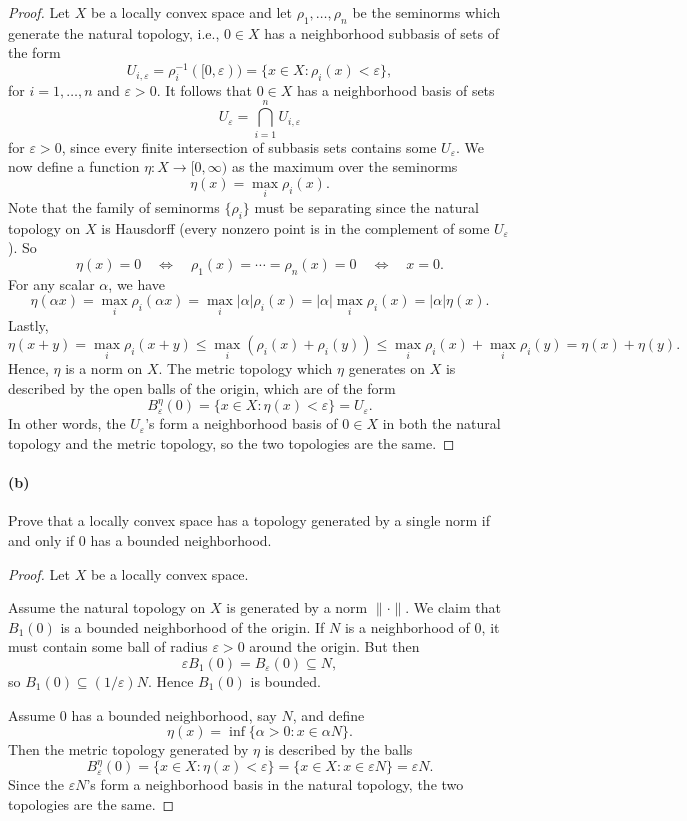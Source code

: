 \documentclass[12pt]{article}
\newlength{\myparskip}
\newenvironment{fullbox}{\begin{lrbox}{\savefullbox}\begin{minipage}{\dimexpr\textwidth-2\fboxsep\relax}\setlength{\parskip}{\myparskip}}{\end{minipage}\end{lrbox}\framebox[\textwidth]{\usebox{\savefullbox}}}
\newenvironment{pbox}[1][]{\begin{fullbox}\def\temp{#1}\ifx\temp\empty\else\paragraph{#1}\phantom{}\fi}{\end{fullbox}}
\theoremstyle{definition}
\newcommand{\isp}[1]{\quad\text{#1}\quad}
\newcommand{\eps}{\varepsilon}
\newcommand{\<}{\langle}
\renewcommand{\>}{\rangle}
\newcommand{\seq}{\subseteq}
\begin{document}
\begin{proof}
    Let $X$ be a locally convex space and let $\rho_1, \dots, \rho_n$ be the seminorms which generate the natural topology, i.e., $0 \in X$ has a neighborhood subbasis of sets of the form
    \[
        U_{i, \eps}
            = \rho_i^{-1}([0, \eps))
            = \{x \in X : \rho_i(x) < \eps\},
    \]
    for $i = 1, \dots, n$ and $\eps > 0$.
    It follows that $0 \in X$ has a neighborhood basis of sets
    \[  
        U_\eps = \bigcap_{i = 1}^n U_{i, \eps}
    \]
    for $\eps > 0$, since every finite intersection of subbasis sets contains some $U_\eps$.
    We now define a function $\eta : X \to [0, \infty)$ as the maximum over the seminorms
    \[
        \eta(x) = \max_i \rho_i(x).
    \]
    Note that the family of seminorms $\{\rho_i\}$ must be separating since the natural topology on $X$ is Hausdorff (every nonzero point is in the complement of some $U_\eps$).
    So
    \[
        \eta(x) = 0 \isp{$\iff$} \rho_1(x) = \cdots = \rho_n(x) = 0 \isp{$\iff$} x = 0.
    \]
    For any scalar $\alpha$, we have
    \[
        \eta(\alpha x)
            = \max_i \rho_i(\alpha x)
            = \max_i |\alpha|\rho_i(x)
            = |\alpha| \max_i \rho_i(x)
            = |\alpha| \eta(x).
    \]
    Lastly,
    \[
        \eta(x + y)
            = \max_i \rho_i(x + y)
            \leq \max_i (\rho_i(x) + \rho_i(y))
            \leq \max_i \rho_i(x) + \max_i \rho_i(y)
            = \eta(x) + \eta(y).
    \]
    Hence, $\eta$ is a norm on $X$.
    The metric topology which $\eta$ generates on $X$ is described by the open balls of the origin, which are of the form
    \[
        B_\eps^\eta(0) = \{x \in X : \eta(x) < \eps\} = U_\eps.
    \]
    In other words, the $U_\eps$'s form a neighborhood basis of $0 \in X$ in both the natural topology and the metric topology, so the two topologies are the same.
\end{proof}


\newpage
\begin{pbox}[(b)]
    Prove that a locally convex space has a topology generated by a single norm if and only if $0$ has a bounded neighborhood.
\end{pbox}

\begin{proof}
    Let $X$ be a locally convex space.

    Assume the natural topology on $X$ is generated by a norm $\|{\cdot}\|$.
    We claim that $B_1(0)$ is a bounded neighborhood of the origin.
    If $N$ is a neighborhood of $0$, it must contain some ball of radius $\eps > 0$ around the origin.
    But then
    \[
        \eps B_1(0) = B_\eps(0) \seq N,
    \]
    so $B_1(0) \seq (1/\eps)N$.
    Hence $B_1(0)$ is bounded.

    Assume $0$ has a bounded neighborhood, say $N$, and define
    \[
        \eta(x) = \inf\{\alpha > 0 : x \in \alpha N\}.
    \]
    Then the metric topology generated by $\eta$ is described by the balls
    \[
        B_\eps^\eta(0)
            = \{x \in X : \eta(x) < \eps\}
            = \{x \in X : x \in \eps N\}
            = \eps N.  
    \]
    Since the $\eps N$'s form a neighborhood basis in the natural topology, the two topologies are the same.
\end{proof}
\end{document}
